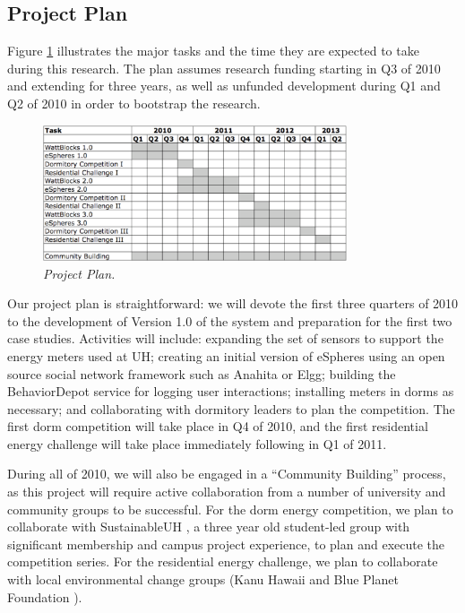 \subsection{Project Plan}
\label{sec:plan}

Figure \ref{fig:plan} illustrates the major tasks and the time they are
expected to take during this research.  The plan assumes research funding
starting in Q3 of 2010 and extending for three years, as well as unfunded
development during Q1 and Q2 of 2010 in order to bootstrap the
research.

\begin{figure}[th]
  \center
  \includegraphics[width=0.8\textwidth]{gantt.eps}
  \caption{\em \small Project Plan.}
 \label{fig:plan}
\end{figure} 

Our project plan is straightforward: we will devote the first three
quarters of 2010 to the development of Version 1.0 of the system and
preparation for the first two case studies.  Activities will include:
expanding the set of sensors to support the energy meters used at UH;
creating an initial version of eSpheres using an open source social network
framework such as Anahita or Elgg; building the BehaviorDepot service for
logging user interactions; installing meters in dorms as necessary; and
collaborating with dormitory leaders to plan the competition. The first
dorm competition will take place in Q4 of 2010, and the first residential
energy challenge will take place immediately following in Q1 of 2011.

During all of 2010, we will also be engaged in a ``Community Building''
process, as this project will require active collaboration from a number of
university and community groups to be successful.  For the dorm energy
competition, we plan to collaborate with SustainableUH
\cite{SustainableUH}, a three year old student-led group with significant
membership and campus project experience, to plan and execute the
competition series.  For the residential energy challenge, we plan to
collaborate with local environmental change groups (Kanu Hawaii
\cite{KanuHawaii} and Blue Planet Foundation \cite{BluePlanetFoundation}).

